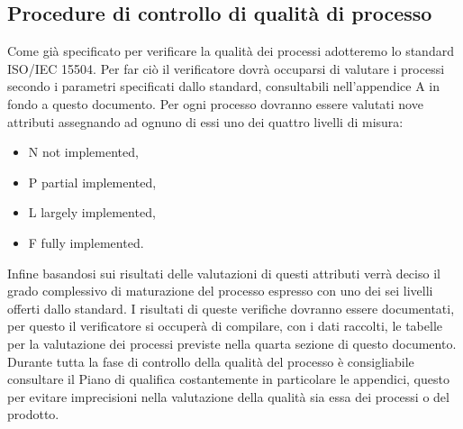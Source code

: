 \subsection{Procedure di controllo di qualità di processo}
Come già specificato per verificare la qualità dei processi adotteremo lo standard ISO/IEC 15504. Per far ciò il verificatore dovrà occuparsi di valutare i processi secondo i parametri specificati dallo standard, consultabili nell'appendice A in fondo a questo documento.
Per ogni processo dovranno essere valutati nove attributi assegnando ad ognuno di essi uno dei quattro livelli di misura: 
\begin{itemize}
\item N not implemented, 
\item P partial implemented, 
\item L largely implemented, 
\item F fully implemented.
\end{itemize}
Infine basandosi sui risultati delle valutazioni di questi attributi verrà deciso il grado complessivo di maturazione del processo espresso con uno dei sei livelli offerti dallo standard. I risultati di queste verifiche dovranno essere documentati, per questo il verificatore si occuperà di compilare, con i dati raccolti, le tabelle per la valutazione dei processi previste nella quarta sezione di questo documento.
Durante tutta la fase di controllo della qualità del processo è consigliabile consultare il Piano di qualifica costantemente in particolare le appendici, questo per evitare imprecisioni nella valutazione della qualità sia essa dei processi o del prodotto.